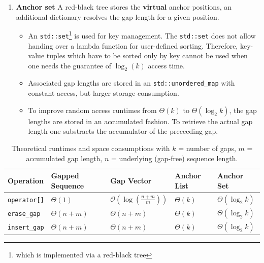 \documentclass[11pt, letterpaper, twoside]{article}
\begin{document}
\begin{enumerate}
\begin{itemize}
    \end{itemize}
    \item {\bf Anchor set} A red-black tree stores the {\bf virtual} anchor positions, an additional dictionary resolves the gap length for a given position.
	\begin{itemize}
		\item An \verb|std::set|\footnote{which is implemented via a red-black tree} is used for key management. The \verb|std::set| does not allow handing over a lambda function for user-defined sorting. Therefore, key-value tuples which have to be sorted only by key cannot be used when one needs the guarantee of $\log_2(k)$ access time.   
		\item Associated gap lengths are stored in an \verb|std::unordered_map| with constant access, but larger storage consumption.
		\item To improve random access runtimes from $\Theta(k)$ to $\Theta(\log_2 k)$, the gap lengths are stored in an accumulated fashion. To retrieve the actual gap length one substracts the accumulator of the preceeding gap.
	\end{itemize}
\end{enumerate}

\begin{table}[htpb]\centering
\begin{tabular}{|l|l|l|l|l|}
\hline
\bf Operation&\bf Gapped Sequence&\bf Gap Vector&\bf Anchor List&\bf Anchor Set\\
\hline
\verb|operator[]|&$\Theta(1)$&$\mathcal{O}(\log(\frac{n+m}{m}))$\footnotemark&$\Theta(k)$&$\Theta(\log_2 k)$\\
\verb|erase_gap|&$\Theta(n+m)$&$\Theta(n+m)$&$\Theta(k)$&$\Theta(\log_2 k)$\\
\verb|insert_gap|&$\Theta(n+m)$&$\Theta (n+m)$&$\Theta(k)$&$\Theta(\log_2 k)$\\
\hline
\end{tabular}\caption{Theoretical runtimes and space consumptions with $k$ = number of gaps, $m$ = accumulated gap length, $n$ = underlying (gap-free) sequence length.}	
\end{table}
\end{document}
